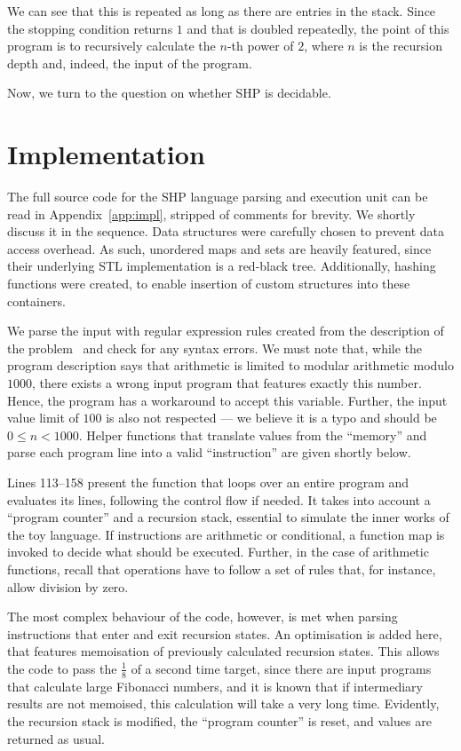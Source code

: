\documentclass[12pt]{article}
\begin{document}
We can see that this is repeated as long as there are entries in the stack. Since the stopping condition returns $1$ and that is doubled repeatedly, the point of this program is to recursively calculate the $n$-th power of $2$, where $n$ is the recursion depth and, indeed, the input of the program.

Now, we turn to the question on whether SHP is decidable. 

\section{Implementation}\label{sec:imp}

The full source code for the SHP language parsing and execution unit can be read in Appendix~\ref{app:impl}, stripped of comments for brevity. We shortly discuss it in the sequence. Data structures were carefully chosen to prevent data access overhead. As such, unordered maps and sets are heavily featured, since their underlying STL implementation is a red-black tree. Additionally, hashing functions were created, to enable insertion of custom structures into these containers. 

We parse the input with regular expression rules created from the description of the problem~\cite{Demasi:misc:2013:may} and check for any syntax errors. We must note that, while the program description says that arithmetic is limited to modular arithmetic modulo $1000$, there exists a wrong input program that features exactly this number. Hence, the program has a workaround to accept this variable. Further, the input value limit of $100$ is also not respected --- we believe it is a typo and should be $0 \leq n < 1000$. Helper functions that translate values from the ``memory'' and parse each program line into a valid ``instruction'' are given shortly below.

Lines 113--158 present the function that loops over an entire program and evaluates its lines, following the control flow if needed. It takes into account a ``program counter'' and a recursion stack, essential to simulate the inner works of the toy language. If instructions are arithmetic or conditional, a function map is invoked to decide what should be executed. Further, in the case of arithmetic functions, recall that operations have to follow a set of rules that, for instance, allow division by zero.

The most complex behaviour of the code, however, is met when parsing instructions that enter and exit recursion states. An optimisation is added here, that features memoisation of previously calculated recursion states. This allows the code to pass the $\frac{1}{8}$ of a second time target, since there are input programs that calculate large Fibonacci numbers, and it is known that if intermediary results are not memoised, this calculation will take a very long time. Evidently, the recursion stack is modified, the ``program counter'' is reset, and values are returned as usual.
\end{document}
